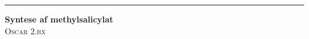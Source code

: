 \begin{titlepage} %
	{
        \vspace*{-2cm}
	\raggedleft%
	
	\rule{1pt}{\textheight} %
	\hspace{0.05\textwidth} %
	\parbox[b]{0.75\textwidth}{ %
		
		{\huge \bfseries Syntese af methylsalicylat}\\[2\baselineskip] %
		{\Large\textsc{Oscar 2.bx}} %
		
		\vspace{0.5\textheight} %
		
	}
    }

\end{titlepage}

\pagebreak
